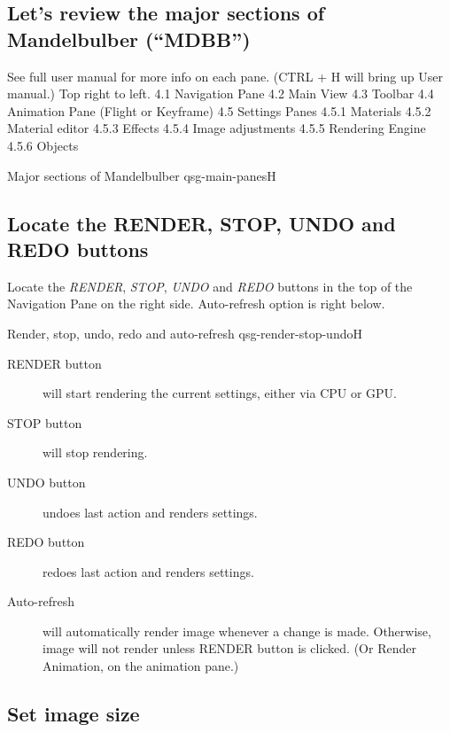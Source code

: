 \subsection{Let’s review the major sections of Mandelbulber (“MDBB”)}\label{qsg-major-sections}

See full user manual for more info on each pane. (CTRL + H will bring up User manual.) Top right to left. 
        4.1 Navigation Pane
        4.2 Main View
        4.3 Toolbar
        4.4 Animation Pane (Flight or Keyframe)
        4.5 Settings Panes
            4.5.1 Materials
            4.5.2 Material editor
            4.5.3 Effects
            4.5.4 Image adjustments
            4.5.5 Rendering Engine
            4.5.6 Objects

{Major sections of Mandelbulber}
{qsg-main-panes}{H}


\subsection{Locate the RENDER, STOP, UNDO and REDO buttons}\label{qsg-render-button}
Locate the \emph{RENDER}, \emph{STOP}, \emph{UNDO} and \emph{REDO} buttons in the top of the Navigation Pane on the right side. Auto-refresh option is right below.

{Render, stop, undo, redo and auto-refresh}
{qsg-render-stop-undo}{H}

\begin{description}
	\item[RENDER button] will start rendering the current settings, either via CPU or GPU.
	\item[STOP button] will stop rendering.
	\item[UNDO button] undoes last action and renders settings.
	\item[REDO button] redoes last action and renders settings.
	\item[Auto-refresh] will automatically render image whenever a change is made. Otherwise, image will not render unless RENDER button is clicked. (Or Render Animation, on the animation pane.)

\end{description}

\subsection{Set image size}\label{qsg-image-size} 

